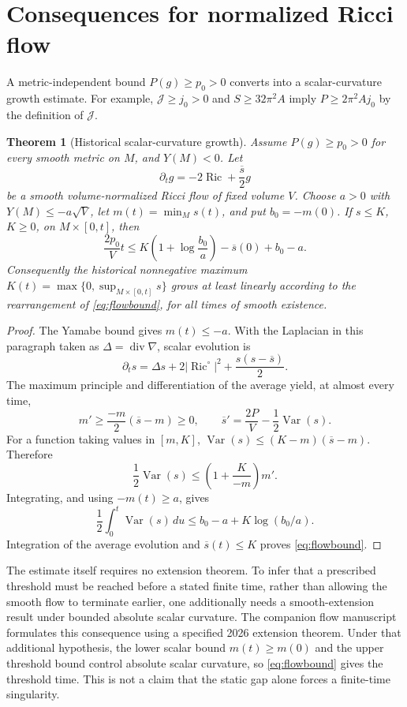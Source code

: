 \documentclass[11pt,a4paper]{article}
\newtheorem{theorem}{Theorem}[section]
\theoremstyle{definition}
\theoremstyle{remark}
\newcommand{\Ric}{\operatorname{Ric}}
\newcommand{\diver}{\operatorname{div}}
\newcommand{\J}{\mathcal J}
\begin{document}
\section{Consequences for normalized Ricci flow}
A metric-independent bound $P(g)\ge p_0>0$ converts into a scalar-curvature growth estimate. For example, $\J\ge j_0>0$ and $S\ge32\pi^2A$ imply $P\ge2\pi^2Aj_0$ by the definition of $\J$.

\begin{theorem}[Historical scalar-curvature growth]\label{thm:flow}
Assume $P(g)\ge p_0>0$ for every smooth metric on $M$, and $Y(M)<0$. Let
\[
 \partial_tg=-2\Ric+\frac{\overline s}{2}g
\]
be a smooth volume-normalized Ricci flow of fixed volume $V$. Choose $a>0$ with $Y(M)\le-a\sqrt V$, let $m(t)=\min_Ms(t)$, and put $b_0=-m(0)$. If $s\le K$, $K\ge0$, on $M\times[0,t]$, then
\begin{equation}
 \frac{2p_0}{V}t
 \le K\left(1+\log\frac{b_0}{a}\right)-\overline s(0)+b_0-a.
 \label{eq:flowbound}
\end{equation}
Consequently the historical nonnegative maximum $K(t)=\max\{0,\sup_{M\times[0,t]}s\}$ grows at least linearly according to the rearrangement of \eqref{eq:flowbound}, for all times of smooth existence.
\end{theorem}
\begin{proof}
The Yamabe bound gives $m(t)\le-a$. With the Laplacian in this paragraph taken as $\Delta=\diver\nabla$, scalar evolution is
\[
 \partial_ts=\Delta s+2|\Ric^\circ|^2+\frac{s(s-\overline s)}2.
\]
The maximum principle and differentiation of the average yield, at almost every time,
\[
 m'\ge\frac{-m}{2}(\overline s-m)\ge0,\qquad
 \overline s'=\frac{2P}{V}-\frac12\operatorname{Var}(s).
\]
For a function taking values in $[m,K]$,
$\operatorname{Var}(s)\le(K-m)(\overline s-m)$. Therefore
\[
 \frac12\operatorname{Var}(s)\le\left(1+\frac K{-m}\right)m'.
\]
Integrating, and using $-m(t)\ge a$, gives
\[
 \frac12\int_0^t\operatorname{Var}(s)\,du
 \le b_0-a+K\log(b_0/a).
\]
Integration of the average evolution and $\overline s(t)\le K$ proves \eqref{eq:flowbound}.
\end{proof}

The estimate itself requires no extension theorem. To infer that a prescribed threshold must be reached before a stated finite time, rather than allowing the smooth flow to terminate earlier, one additionally needs a smooth-extension result under bounded absolute scalar curvature. The companion flow manuscript \cite{Flow} formulates this consequence using a specified 2026 extension theorem. Under that additional hypothesis, the lower scalar bound $m(t)\ge m(0)$ and the upper threshold bound control absolute scalar curvature, so \eqref{eq:flowbound} gives the threshold time. This is not a claim that the static gap alone forces a finite-time singularity.
\end{document}
